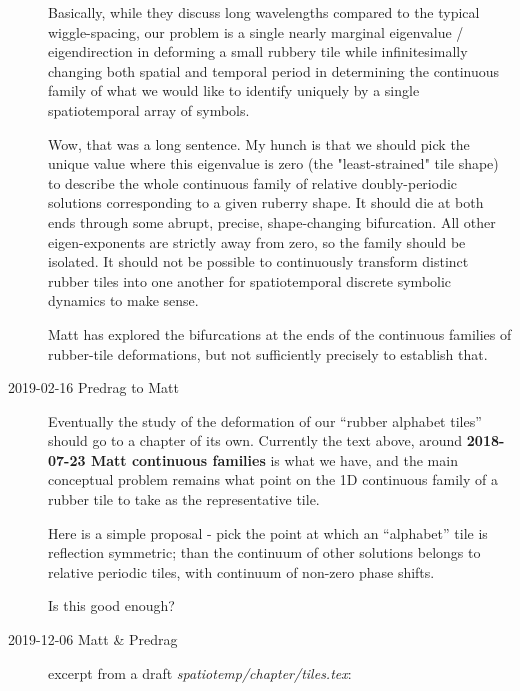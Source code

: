 \begin{description}
Basically, while they discuss long wavelengths compared to the typical
wiggle-spacing, our problem is a single nearly marginal
eigenvalue / eigendirection in deforming a small rubbery tile while
infinitesimally changing both spatial and temporal period in determining
the continuous family of what we would like to identify uniquely by a
single spatiotemporal array of symbols.

Wow, that was a long sentence. My hunch is that we should pick the unique
value where this eigenvalue is zero (the "least-strained" tile shape) to
describe the whole continuous family of relative doubly-periodic
solutions corresponding to a given ruberry shape. It should die at both
ends through some abrupt, precise, shape-changing bifurcation. All other
eigen-exponents are strictly away from zero, so the family should be
isolated. It should not be possible to continuously transform distinct
rubber tiles into one another for spatiotemporal discrete symbolic
dynamics to make sense.

Matt has explored the bifurcations at the ends of the continuous families
of rubber-tile deformations, but not sufficiently precisely to establish
that.

\item[2019-02-16 Predrag to Matt]
Eventually the study of the deformation of our ``rubber alphabet tiles'' should
go to a chapter of its own. Currently the text above, around
{\bf 2018-07-23 Matt continuous families} is what we have,
and the main conceptual problem remains what point on the 1D continuous
family of a rubber tile to take as the representative tile.

Here is a simple proposal - pick the point at which an ``alphabet'' tile is
reflection symmetric;
than the continuum of other solutions belongs to relative periodic tiles,
with continuum of non-zero phase shifts.

Is this good enough?


\item[2019-12-06 Matt \& Predrag] excerpt from a draft
{\em spatiotemp/chapter/tiles.tex}:


\end{description}
